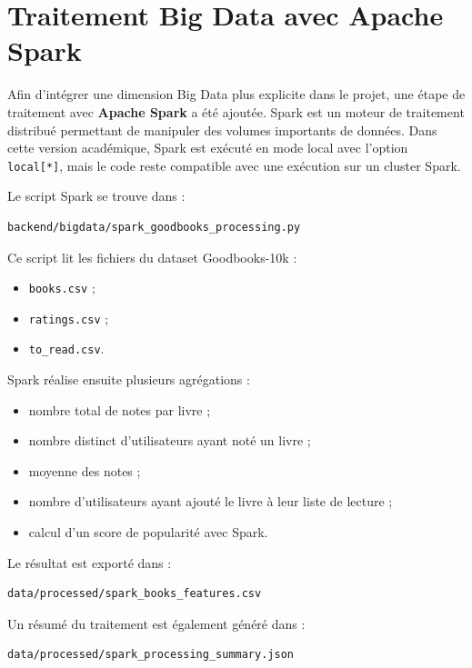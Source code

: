 \section{Traitement Big Data avec Apache Spark}

Afin d'intégrer une dimension Big Data plus explicite dans le projet, une étape de traitement avec \textbf{Apache Spark} a été ajoutée. Spark est un moteur de traitement distribué permettant de manipuler des volumes importants de données. Dans cette version académique, Spark est exécuté en mode local avec l'option \texttt{local[*]}, mais le code reste compatible avec une exécution sur un cluster Spark.

Le script Spark se trouve dans :

\begin{lstlisting}[language=bash]
backend/bigdata/spark_goodbooks_processing.py
\end{lstlisting}

Ce script lit les fichiers du dataset Goodbooks-10k :

\begin{itemize}
    \item \texttt{books.csv} ;
    \item \texttt{ratings.csv} ;
    \item \texttt{to\_read.csv}.
\end{itemize}

Spark réalise ensuite plusieurs agrégations :

\begin{itemize}
    \item nombre total de notes par livre ;
    \item nombre distinct d'utilisateurs ayant noté un livre ;
    \item moyenne des notes ;
    \item nombre d'utilisateurs ayant ajouté le livre à leur liste de lecture ;
    \item calcul d'un score de popularité avec Spark.
\end{itemize}

Le résultat est exporté dans :

\begin{lstlisting}[language=bash]
data/processed/spark_books_features.csv
\end{lstlisting}

Un résumé du traitement est également généré dans :

\begin{lstlisting}[language=bash]
data/processed/spark_processing_summary.json
\end{lstlisting}

